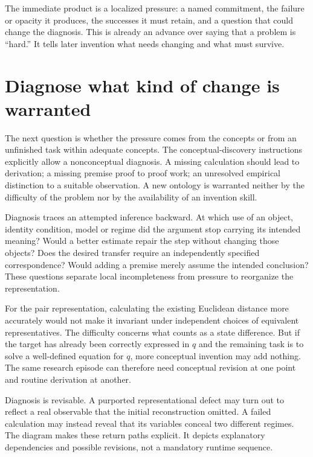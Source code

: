 The immediate product is a localized pressure: a named commitment, the failure or
opacity it produces, the successes it must retain, and a question that could
change the diagnosis. This is already an advance over saying that a problem is
``hard.'' It tells later invention what needs changing and what must survive.

\section{Diagnose what kind of change is warranted}
\label{sec:conceptual-diagnosis}
The next question is whether the pressure comes from the concepts or from an
unfinished task within adequate concepts. The conceptual-discovery instructions
explicitly allow a nonconceptual diagnosis. A missing calculation should lead to
derivation; a missing premise proof to proof work; an unresolved empirical
distinction to a suitable observation. A new ontology is warranted neither by
the difficulty of the problem nor by the availability of an invention skill.

Diagnosis traces an attempted inference backward. At which use of an object,
identity condition, model or regime did the argument stop carrying its intended
meaning? Would a better estimate repair the step without changing those objects?
Does the desired transfer require an independently specified correspondence?
Would adding a premise merely assume the intended conclusion? These questions
separate local incompleteness from pressure to reorganize the representation.

For the pair representation, calculating the existing Euclidean distance more
accurately would not make it invariant under independent choices of equivalent
representatives. The difficulty concerns what counts as a state difference. But
if the target has already been correctly expressed in $q$ and the remaining task
is to solve a well-defined equation for $q$, more conceptual invention may add
nothing. The same research episode can therefore need conceptual revision at one
point and routine derivation at another.

Diagnosis is revisable. A purported representational defect may turn out to
reflect a real observable that the initial reconstruction omitted. A failed
calculation may instead reveal that its variables conceal two different regimes.
The diagram makes these return paths explicit. It depicts explanatory
dependencies and possible revisions, not a mandatory runtime sequence.

